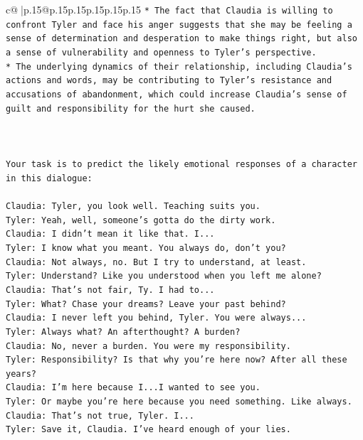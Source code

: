 \documentclass{article}
\begin{document}
{\begin{supertabular}{c@{$\;$}|p{.15\linewidth}@{}p{.15\linewidth}p{.15\linewidth}p{.15\linewidth}p{.15\linewidth}p{.15\linewidth}}
{{{\texttt{* The fact that Claudia is willing to confront Tyler and face his anger suggests that she may be feeling a sense of determination and desperation to make things right, but also a sense of vulnerability and openness to Tyler's perspective.} \\
\texttt{* The underlying dynamics of their relationship, including Claudia's actions and words, may be contributing to Tyler's resistance and accusations of abandonment, which could increase Claudia's sense of guilt and responsibility for the hurt she caused.} \\
\\ 
\\ 
\\ 
\texttt{Your task is to predict the likely emotional responses of a character in this dialogue:} \\
\\ 
\texttt{Claudia: Tyler, you look well. Teaching suits you.} \\
\texttt{Tyler: Yeah, well, someone's gotta do the dirty work.} \\
\texttt{Claudia: I didn't mean it like that. I...} \\
\texttt{Tyler: I know what you meant. You always do, don't you?} \\
\texttt{Claudia: Not always, no. But I try to understand, at least.} \\
\texttt{Tyler: Understand? Like you understood when you left me alone?} \\
\texttt{Claudia: That's not fair, Ty. I had to...} \\
\texttt{Tyler: What? Chase your dreams? Leave your past behind?} \\
\texttt{Claudia: I never left you behind, Tyler. You were always...} \\
\texttt{Tyler: Always what? An afterthought? A burden?} \\
\texttt{Claudia: No, never a burden. You were my responsibility.} \\
\texttt{Tyler: Responsibility? Is that why you're here now? After all these years?} \\
\texttt{Claudia: I'm here because I...I wanted to see you.} \\
\texttt{Tyler: Or maybe you're here because you need something. Like always.} \\
\texttt{Claudia: That's not true, Tyler. I...} \\
\texttt{Tyler: Save it, Claudia. I've heard enough of your lies.} \\
}}}
\end{supertabular}}
\end{document}
